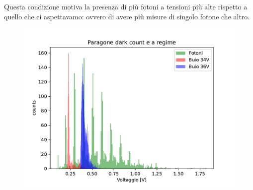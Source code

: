 Questa condizione motiva la presenza di più fotoni a tensioni più alte rispetto a quello che ci aspettavamo: ovvero di avere più misure di singolo fotone che altro.\\
\begin{figure}
    \centering
    \includegraphics[width=\linewidth]{Photomultiplier/assets/Paragone_dark_count.pdf}
    \label{fig:dark_count}
\end{figure}